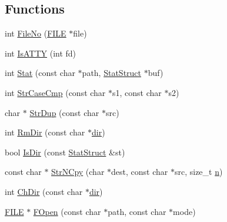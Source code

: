 \subsection*{Functions}
\begin{DoxyCompactItemize}
\item 
int \hyperlink{namespacetesting_1_1internal_1_1posix_a3117b067e1f942a2031e666953120ccc}{File\+No} (\hyperlink{gmock__output__test__golden_8txt_ab12dc6c67167ae2f0af132bdd8c2955e}{F\+I\+LE} $\ast$file)
\item 
int \hyperlink{namespacetesting_1_1internal_1_1posix_a16ebe936b3a8ea462a94191635aedc27}{Is\+A\+T\+TY} (int fd)
\item 
int \hyperlink{namespacetesting_1_1internal_1_1posix_a2b87b7ff647a128614daf50667eb9304}{Stat} (const char $\ast$path, \hyperlink{namespacetesting_1_1internal_1_1posix_a8eb9f08d3af29941c2d2a964cfff3ecb}{Stat\+Struct} $\ast$buf)
\item 
int \hyperlink{namespacetesting_1_1internal_1_1posix_a1ef2385a7f8e4c706054da35967e76bd}{Str\+Case\+Cmp} (const char $\ast$s1, const char $\ast$s2)
\item 
char $\ast$ \hyperlink{namespacetesting_1_1internal_1_1posix_a8e352884793a65ae8be144676f1a9136}{Str\+Dup} (const char $\ast$src)
\item 
int \hyperlink{namespacetesting_1_1internal_1_1posix_acbad5d4ea5b73fd1765f5f760642932a}{Rm\+Dir} (const char $\ast$\hyperlink{app_2main_8cpp_a1029bef95cd6f5393d98c23a33550e15}{dir})
\item 
bool \hyperlink{namespacetesting_1_1internal_1_1posix_af0d04ed5baeed28353fa38742748a421}{Is\+Dir} (const \hyperlink{namespacetesting_1_1internal_1_1posix_a8eb9f08d3af29941c2d2a964cfff3ecb}{Stat\+Struct} \&st)
\item 
const char $\ast$ \hyperlink{namespacetesting_1_1internal_1_1posix_a36fca815713332e5c6dc92c98b6b2574}{Str\+N\+Cpy} (char $\ast$dest, const char $\ast$src, size\+\_\+t \hyperlink{app_2main_8cpp_acfc02ec89670db29251fda6a66602ce2}{n})
\item 
int \hyperlink{namespacetesting_1_1internal_1_1posix_a1ddc8a4fc6bb21da372307485591a212}{Ch\+Dir} (const char $\ast$\hyperlink{app_2main_8cpp_a1029bef95cd6f5393d98c23a33550e15}{dir})
\item 
\hyperlink{gmock__output__test__golden_8txt_ab12dc6c67167ae2f0af132bdd8c2955e}{F\+I\+LE} $\ast$ \hyperlink{namespacetesting_1_1internal_1_1posix_a4042201dcc4932641d484e7ddf94de7d}{F\+Open} (const char $\ast$path, const char $\ast$mode)
\item 

\end{DoxyCompactItemize}
